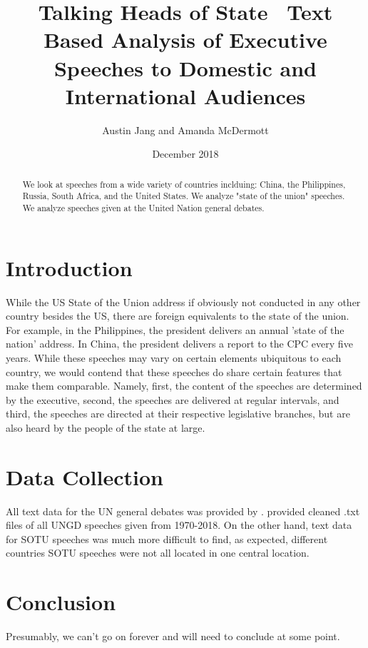 \documentclass[12pt]{article}
\title{%
  Talking Heads of State \
  \large Text Based Analysis of Executive Speeches to Domestic and International Audiences}
\author{Austin Jang and Amanda McDermott}
\date{December 2018}
\begin{document}
\maketitle
\begin{abstract}
We look at speeches from a wide variety of countries inclduing: China, the Philippines, Russia, South Africa, and the United States. We analyze "state of the union" speeches.
We analyze speeches given at the United Nation general debates.
\end{abstract}
\doublespacing
\tableofcontents
\clearpage
\section{Introduction}
\label{sec:intro}

While the US State of the Union address if obviously not conducted in any other country besides the US, there are
foreign equivalents to the state of the union. For example, in the Philippines, the president delivers an annual 'state
of the nation' address. In China, the president delivers a report to the CPC every five years. While these speeches may vary
on certain elements ubiquitous to each country, we would contend that these speeches do share certain features that make them
comparable. Namely, first, the content of the speeches are determined by the executive, second, the speeches are delivered at
regular intervals, and third, the speeches are directed at their respective legislative branches, but are also heard by the people of the
state at large.

\section{Data Collection}
\label{sec:data}

All text data for the UN general debates was provided by \cite{baturo:08}. \cite{baturo:08} provided cleaned .txt files of all UNGD
speeches given from 1970-2018.  On the other hand, text data for SOTU speeches was much more difficult to find, as expected,
different countries SOTU speeches were not all located in one central location. 

\section{Conclusion}
\label{sec:conc}

Presumably, we can't go on forever and will need to conclude at some point.
\end{document}
